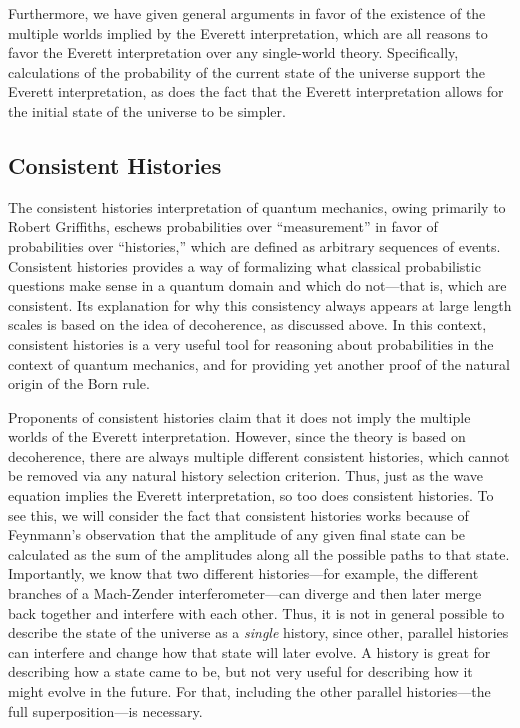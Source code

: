 \documentclass[
    12pt,
    letterpaper,
    aps,
    prd,
    longbibliography,
    twocolumn,
    nofootinbib,
    raggedbottom,
    amsmath,
    amssymb,
    amsfonts,
]{revtex4-1}
\begin{document}
Furthermore, we have given general arguments in favor of the existence of the multiple worlds implied by the Everett interpretation, which are all reasons to favor the Everett interpretation over any single-world theory. Specifically, calculations of the probability of the current state of the universe support the Everett interpretation\cite{falsification}, as does the fact that the Everett interpretation allows for the initial state of the universe to be simpler\cite{arrowoftime}.

\subsection{Consistent Histories}

The consistent histories interpretation of quantum mechanics, owing primarily to Robert Griffiths, eschews probabilities over ``measurement'' in favor of probabilities over ``histories,'' which are defined as arbitrary sequences of events.\cite{griffiths} Consistent histories provides a way of formalizing what classical probabilistic questions make sense in a quantum domain and which do not---that is, which are consistent. Its explanation for why this consistency always appears at large length scales is based on the idea of decoherence, as discussed above.\cite{griffiths}\cite{gellmann} In this context, consistent histories is a very useful tool for reasoning about probabilities in the context of quantum mechanics, and for providing yet another proof of the natural origin of the Born rule.

Proponents of consistent histories claim that it does not imply the multiple worlds of the Everett interpretation.\cite{griffiths} However, since the theory is based on decoherence, there are always multiple different consistent histories, which cannot be removed via any natural history selection criterion.\cite{setselection}\cite{gellmann} Thus, just as the wave equation implies the Everett interpretation, so too does consistent histories. To see this, we will consider the fact that consistent histories works because of Feynmann's observation that the amplitude of any given final state can be calculated as the sum of the amplitudes along all the possible paths to that state.\cite{gellmann}\cite{pathintegral} Importantly, we know that two different histories---for example, the different branches of a Mach-Zender interferometer---can diverge and then later merge back together and interfere with each other. Thus, it is not in general possible to describe the state of the universe as a \textit{single} history, since other, parallel histories can interfere and change how that state will later evolve. A history is great for describing how a state came to be, but not very useful for describing how it might evolve in the future. For that, including the other parallel histories---the full superposition---is necessary.
\end{document}
